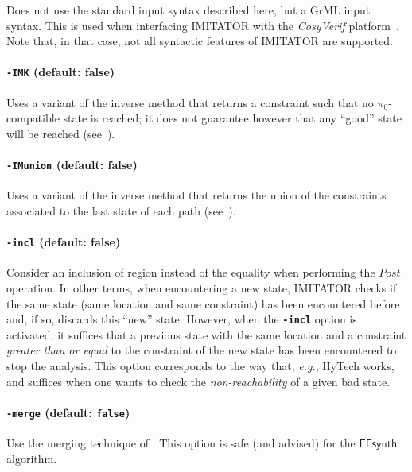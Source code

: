 \documentclass[a4paper,11pt]{report}
\makeatletter
\newcommand{\pio}{\pi_0}
\newcommand{\EFsynth}{\ensuremath{\mathsf{EFsynth}}}
\newcommand{\CosyVerif}{\emph{CosyVerif}}
\newcommand{\hytech}{{\sc HyTech}}
\newcommand{\imitator}{\textsf{IMITATOR}}
\newcommand{\code}[1]{\textbf{\texttt{#1}}}
\newcommand{\styleOption}[1]{\textcolor{optioncolor}{\texttt{#1}}}
\newcommand{\eg}{\textcolor{colorok}{\textit{e.g.},\@}}
\makeatother
\begin{document}
Does not use the standard input syntax described here, but a GrML input syntax.
This is used when interfacing \imitator{} with the \CosyVerif{} platform~\cite{AHHKLLP13}.
Note that, in that case, not all syntactic features of \imitator{} are supported.



\paragraph{\styleOption{-IMK} (default: false)}
Uses a variant of the inverse method that returns a constraint such that no $\pio$-compatible state is reached; it does not guarantee however that any ``good'' state will be reached (see~\cite{AS13}).



\paragraph{\styleOption{-IMunion} (default: false)}
Uses a variant of the inverse method that returns the union of the constraints associated to the last state of each path (see~\cite{AS13}).


\paragraph{\styleOption{-incl} (default: false)}
Consider an inclusion of region instead of the equality when performing the $\textit{Post}$ operation.
In other terms, when encountering a new state, \imitator{} checks if the same state (same location and same constraint) has been encountered before and, if so, discards this ``new'' state.
However, when the \code{-incl} option is activated, it suffices that a previous state with the same location and a constraint \emph{greater than or equal} to the constraint of the new state has been encountered to stop the analysis.
This option corresponds to the way that, \eg{} \hytech{} works, and suffices when one wants to check the \emph{non-reachability} of a given bad state.


\paragraph{\styleOption{-merge} (default: \code{false})}
Use the merging technique of \cite{AFS13atva}.
This option is safe (and advised) for the \EFsynth{} algorithm.
\end{document}
